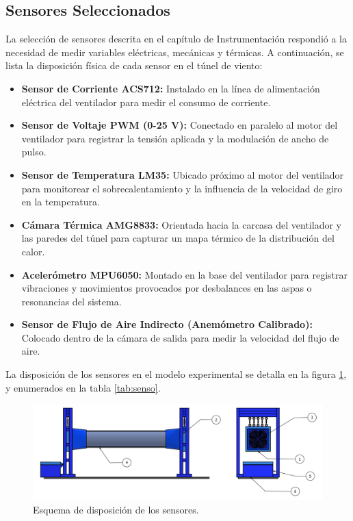 \subsection{Sensores Seleccionados}
La selección de sensores descrita en el capítulo de Instrumentación respondió a la necesidad de medir variables eléctricas, mecánicas y térmicas. A continuación, se lista la disposición física de cada sensor en el túnel de viento:
\begin{itemize}
    \item \textbf{Sensor de Corriente ACS712:} Instalado en la línea de alimentación eléctrica del ventilador para medir el consumo de corriente.
    \item \textbf{Sensor de Voltaje PWM (0-25 V):} Conectado en paralelo al motor del ventilador para registrar la tensión aplicada y la modulación de ancho de pulso.
    \item \textbf{Sensor de Temperatura LM35:} Ubicado próximo al motor del ventilador para monitorear el sobrecalentamiento y la influencia de la velocidad de giro en la temperatura.
    \item \textbf{Cámara Térmica AMG8833:} Orientada hacia la carcasa del ventilador y las paredes del túnel para capturar un mapa térmico de la distribución del calor.
    \item \textbf{Acelerómetro MPU6050:} Montado en la base del ventilador para registrar vibraciones y movimientos provocados por desbalances en las aspas o resonancias del sistema.
    \item \textbf{Sensor de Flujo de Aire Indirecto (Anemómetro Calibrado):} Colocado dentro de la cámara de salida para medir la velocidad del flujo de aire.
\end{itemize}

La disposición de los sensores en el modelo experimental se detalla en la figura \ref{fig:sens}, y enumerados en la tabla \ref{tab:senso}.

\begin{figure}[!ht]
    \centering
    \includegraphics[width=0.8\linewidth]{images/sens.png}
    \caption{Esquema de disposición de los sensores.}
    \label{fig:sens}
\end{figure}

